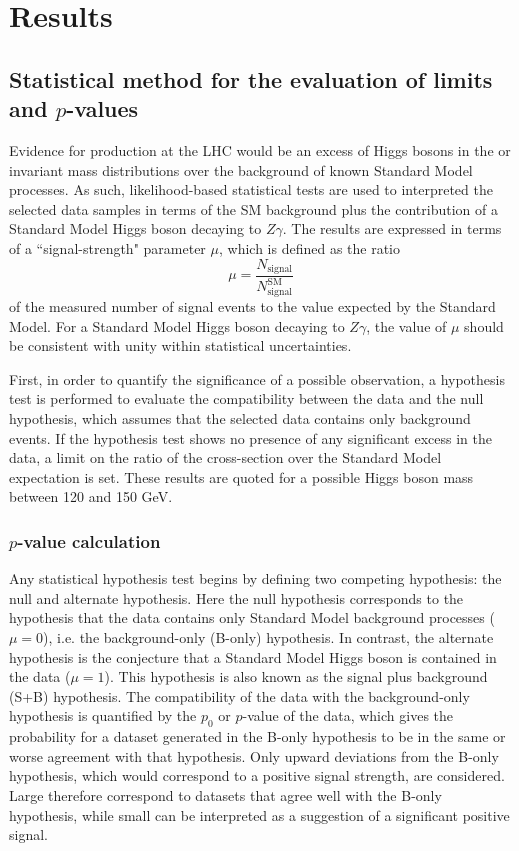 \section{Results}
\label{sec:results}

\subsection{Statistical method for the evaluation of limits and $p$-values}
\label{subsec:statintro}
Evidence for \HToZg production at the LHC would be an excess of Higgs bosons 
in the \dm or \mllg invariant mass distributions over the background of known
Standard Model processes. As such, likelihood-based statistical tests are used to
interpreted the selected data samples in terms of the SM background plus the 
contribution of a Standard Model Higgs boson decaying to $Z\gamma$.
The results are expressed in terms of a ``signal-strength" parameter 
$\mu$, which is defined as the ratio
\[
    \mu = \frac{N_{\text{signal}}}{N_{\text{signal}}^{\text{SM}}}
\]
of the measured number of signal events to the value expected by the
Standard Model. For a Standard Model Higgs boson decaying to $Z\gamma$,
the value of $\mu$ should be consistent with unity within statistical uncertainties.

First, in order to quantify the significance of a possible observation,
a hypothesis test is performed to evaluate the
compatibility between the data and the null hypothesis, which assumes
that the selected data contains only background events. If the hypothesis
test shows no presence of any significant excess in the data, 
a limit on the ratio of the \HToZg cross-section over the Standard Model 
expectation is set. These results are quoted for a possible Higgs boson mass 
between 120 and 150 GeV.

\subsubsection{$p$-value calculation}
Any statistical hypothesis test begins by defining two competing hypothesis:
the null and alternate hypothesis. Here the null hypothesis corresponds to the
hypothesis that the data contains only Standard Model background processes 
($\mu = 0$), i.e. the background-only (B-only) hypothesis. 
In contrast, the alternate hypothesis is the conjecture that a Standard Model
Higgs boson is contained in the data ($\mu = 1$). This hypothesis is also known
as the signal plus background (S+B) hypothesis. The compatibility of the
data with the background-only hypothesis is quantified by the $p_0$ or $p$-value
of the data, which gives the probability for a dataset generated in the
B-only hypothesis to be in the same or worse agreement with that hypothesis.
Only upward deviations from the B-only hypothesis, which would correspond to
a positive signal strength, are considered. Large \pzero therefore correspond
to datasets that agree well with the B-only hypothesis, while small \pzero can
be interpreted as a suggestion of a significant positive signal.

